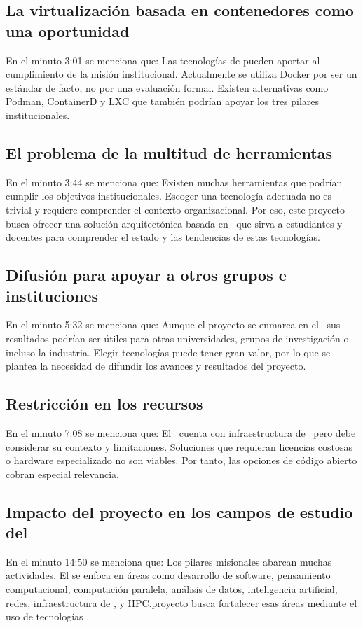 \subsection{La virtualización basada en contenedores como una oportunidad}
En el minuto 3:01 se menciona que: Las tecnologías de \VBC pueden aportar al cumplimiento de la misión institucional. Actualmente se utiliza Docker por ser un estándar de facto, no por una evaluación formal. Existen alternativas como Podman, ContainerD y LXC que también podrían apoyar los tres pilares institucionales.

\subsection{El problema de la multitud de herramientas}
En el minuto 3:44 se menciona que: Existen muchas herramientas que podrían cumplir los objetivos institucionales. Escoger una tecnología adecuada no es trivial y requiere comprender el contexto organizacional. Por eso, este proyecto busca ofrecer una solución arquitectónica basada en \VBC\, que sirva a estudiantes y docentes para comprender el estado y las tendencias de estas tecnologías.

\subsection{Difusión para apoyar a otros grupos e instituciones}
En el minuto 5:32 se menciona que: Aunque el proyecto se enmarca en el \GRID\, sus resultados podrían ser útiles para otras universidades, grupos de investigación o incluso la industria. Elegir tecnologías \VBC{} puede tener gran valor, por lo que se plantea la necesidad de difundir los avances y resultados del proyecto.

\subsection{Restricción en los recursos}
En el minuto 7:08 se menciona que: El \GRID\ cuenta con infraestructura de \TI\, pero debe considerar su contexto y limitaciones. Soluciones que requieran licencias costosas o hardware especializado no son viables. Por tanto, las opciones de código abierto cobran especial relevancia.

\subsection{Impacto del proyecto en los campos de estudio del \GRID}
En el minuto 14:50 se menciona que: Los pilares misionales abarcan muchas actividades. El \GRID se enfoca en áreas como desarrollo de software, pensamiento computacional, computación paralela, análisis de datos, inteligencia artificial, redes, infraestructura de \TI, y HPC.\@Este proyecto busca fortalecer esas áreas mediante el uso de tecnologías \VBC.\@

